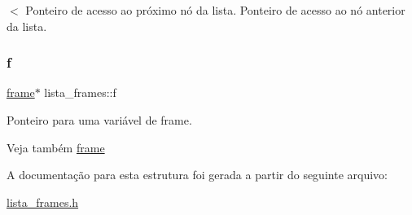 $<$ Ponteiro de acesso ao próximo nó da lista. Ponteiro de acesso ao nó anterior da lista. \mbox{\label{structlista__frames_ad7777179f480ab04a686cf8edf19addf}} 
\subsubsection{\texorpdfstring{f}{f}}
{\footnotesize\ttfamily \hyperlink{structframe}{frame}$\ast$ lista\+\_\+frames\+::f}

Ponteiro para uma variável de frame. \begin{DoxySeeAlso}{Veja também}
\hyperlink{structframe}{frame} 
\end{DoxySeeAlso}


A documentação para esta estrutura foi gerada a partir do seguinte arquivo\+:\begin{DoxyCompactItemize}
\item 
\hyperlink{lista__frames_8h}{lista\+\_\+frames.\+h}\end{DoxyCompactItemize}
